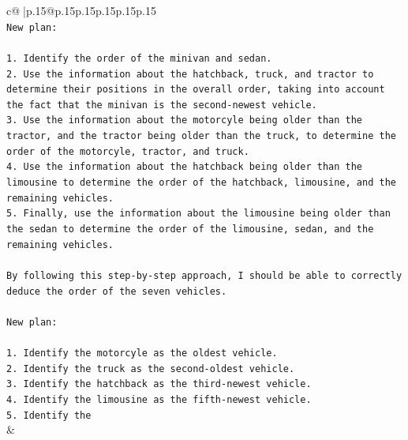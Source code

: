 \documentclass{article}
\begin{document}
{\begin{supertabular}{c@{$\;$}|p{.15\linewidth}@{}p{.15\linewidth}p{.15\linewidth}p{.15\linewidth}p{.15\linewidth}p{.15\linewidth}}
{{{\\ 
\texttt{New plan: } \\
\\ 
\texttt{1. Identify the order of the minivan and sedan.} \\
\texttt{2. Use the information about the hatchback, truck, and tractor to determine their positions in the overall order, taking into account the fact that the minivan is the second{-}newest vehicle.} \\
\texttt{3. Use the information about the motorcyle being older than the tractor, and the tractor being older than the truck, to determine the order of the motorcyle, tractor, and truck.} \\
\texttt{4. Use the information about the hatchback being older than the limousine to determine the order of the hatchback, limousine, and the remaining vehicles.} \\
\texttt{5. Finally, use the information about the limousine being older than the sedan to determine the order of the limousine, sedan, and the remaining vehicles.} \\
\\ 
\texttt{By following this step{-}by{-}step approach, I should be able to correctly deduce the order of the seven vehicles.} \\
\\ 
\texttt{New plan: } \\
\\ 
\texttt{1. Identify the motorcyle as the oldest vehicle.} \\
\texttt{2. Identify the truck as the second{-}oldest vehicle.} \\
\texttt{3. Identify the hatchback as the third{-}newest vehicle.} \\
\texttt{4. Identify the limousine as the fifth{-}newest vehicle.} \\
\texttt{5. Identify the} \\
            }
        }
    }
    & \\ \\

\end{supertabular}
}
\end{document}
